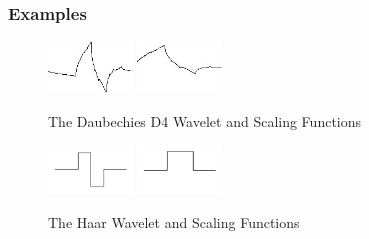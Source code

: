 \documentclass{beamer}
\def\RImageSize{0.2\textwidth}
\def\RImageSpace{\hspace{1cm}}
\begin{document}
\begin{frame}
  \frametitle{Examples}

  \begin{figure}[hbt]
    \begin{center}
      \includegraphics[width=\RImageSize]{daubechies-d4-wavelet.jpg}
      \RImageSpace
      \includegraphics[width=\RImageSize]{daubechies-d4-scaling.jpg}
      \caption{The Daubechies D4 Wavelet and Scaling Functions}
    \end{center}
  \end{figure}

  \pause
  \begin{figure}[hbt]
    \begin{center}
      \includegraphics[width=\RImageSize]{haar-wavelet.jpg}
      \RImageSpace
      \includegraphics[width=\RImageSize]{haar-scaling.jpg}
      \caption{The Haar Wavelet and Scaling Functions}
    \end{center}
  \end{figure}

\end{frame}
\end{document}
